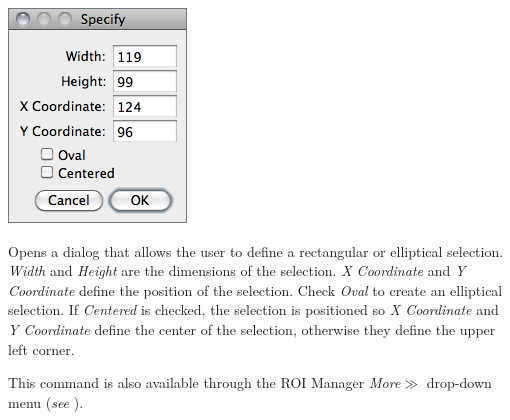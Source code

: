 \begin{minipage}[c][1\totalheight][t]{0.27\columnwidth}%
\includegraphics[scale=0.55]{images/Specify}%
\end{minipage}%
\begin{minipage}[c][1\totalheight][t]{0.73\columnwidth}%
Opens a dialog that allows the user to define a rectangular or elliptical
selection. \emph{Width} and \emph{Height} are the dimensions of the
selection. \emph{X Coordinate} and \emph{Y Coordinate} define the
position of the selection. Check \emph{Oval} to create an elliptical
selection. If \emph{Centered} is checked, the selection is positioned
so \emph{X Coordinate} and \emph{Y Coordinate} define the center of
the selection, otherwise they define the upper left corner.\medskip{}


This command is also available through the ROI Manager \emph{More}{\scriptsize $\gg$}
drop-down menu (\emph{see} ).%
\end{minipage}


\subsubsection{\protect{}\label{sub:Straighten...}}

